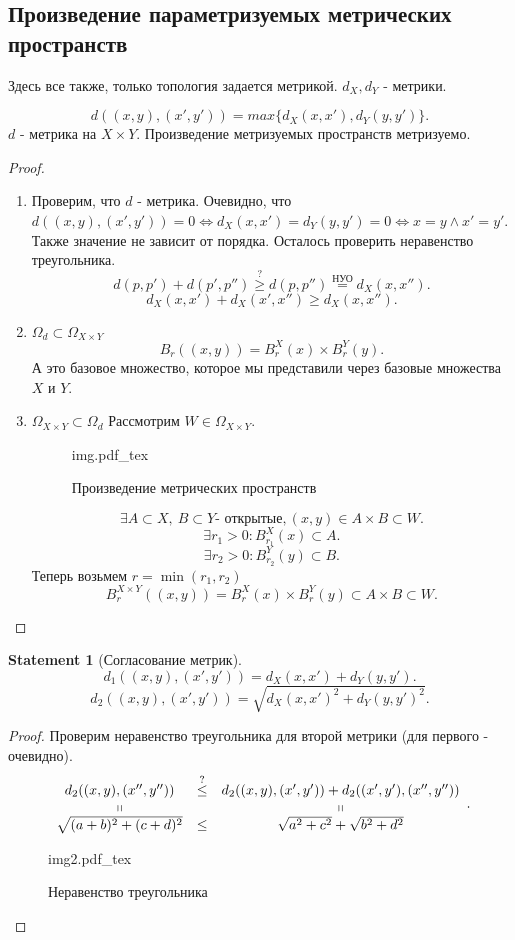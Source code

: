\documentclass[11pt]{book}
\newcommand{\incfig}[1]{%
    \def\svgwidth{\columnwidth}
    {#1.pdf_tex}
}
\theoremstyle{definition}
\theoremstyle{plain}
\theoremstyle{plain}
\newtheorem*{st}{Statement}
\theoremstyle{definition}
\theoremstyle{remark}
\begin{document}
\subsection{Произведение параметризуемых метрических пространств}
Здесь все также, только топология задается метрикой.
$d_X, d_Y$ - метрики.
\begin{thm}
    \[
	d((x, y) , (x', y')) = max \{d_X(x, x'), d_Y(y, y')\}
    .\] 
    $d$ - метрика на $X \times Y$.
   Произведение метризуемых пространств метризуемо. 
\end{thm}
\begin{proof}
    \begin{enumerate}
	\item
    Проверим, что $d$ - метрика.
    Очевидно, что $d((x, y), (x', y')) = 0 \Longleftrightarrow d_X(x, x') = d_Y(y, y') = 0 \Longleftrightarrow x = y \wedge x' = y'$. Также значение не зависит от порядка. Осталось проверить неравенство треугольника.
    \[
	d(p, p') + d(p', p'') \stackrel{?}\ge  d(p, p'') \stackrel{\text{НУО}} = d_X(x, x'')
    .\] 
    \[
	d_X(x, x') + d_X(x', x'') \ge d_X(x, x'')
    .\] 
\item $\Omega_d \subset \Omega _{X \times Y} $
    \[
	B_r((x, y)) = B_r^X(x) \times B_r^Y(y) 
    .\] 
    А  это базовое множество, которое мы представили через базовые множества $X$ и $Y$.

\item $\Omega _{X \times Y} \subset \Omega_d$
    Рассмотрим  $W \in \Omega _{X \times Y}$.
\begin{figure}[ht]
    \centering
    \incfig{img}
    \caption{Произведение метрических пространств}
    \label{fig:img}
\end{figure}
    \[
	\exists A \subset X, ~ B \subset Y \mbox{- открытые}, (x, y) \in  A\times B \subset W 
    .\] 
    \[
	\exists r_1 > 0: B_{r_1}^X(x) \subset A
    .\] 
    \[
	\exists r_2 > 0: B_{r_2}^Y(y) \subset B
    .\] 
    Теперь возьмем $r = \min (r_1, r_2)$
    \[
	B_r^{X \times Y} ((x, y)) = B_r^X(x) \times B_r^Y(y) \subset A \times B \subset W
    .\] 
    \end{enumerate}
\end{proof}
\begin{st}[Согласование метрик]
    \[
	d_1 ((x, y), (x', y')) = d_X(x, x') + d_Y(y, y')
    .\] 
    \[
	d_2((x, y), (x', y')) = \sqrt{d_X(x, x')^2 + d_Y (y, y')^2}
    .\] 
\end{st}
\begin{proof}
    Проверим неравенство треугольника для второй метрики (для первого - очевидно).
    \[
	\begin{array}{ccc}
	    d_2((x, y), (x'', y'')) &\stackrel{?}\le & d_2((x, y), (x', y')) + d_2((x', y'), (x'', y'')) \\
	    \shortparallel & & \shortparallel \\
	    \sqrt{(a + b)^2 + (c+d)^2} & \le & \sqrt {a^2+c^2} + \sqrt {b^2+d^2}
	\end{array}
    .\] 
\begin{figure}[ht]
    \centering
    \incfig{img2}
    \caption{Неравенство треугольника}
    \label{fig:img2}
\end{figure}
\end{proof}
\end{document}
